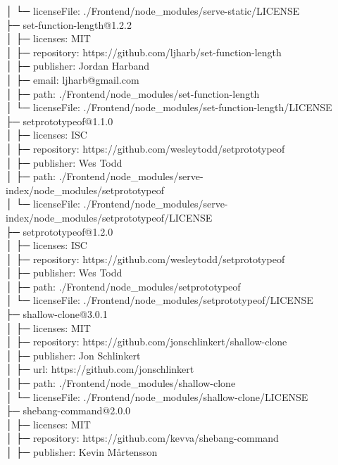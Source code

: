 │  └─ licenseFile: ./Frontend/node\_modules/serve-static/LICENSE\\
├─ set-function-length@1.2.2\\
│  ├─ licenses: MIT\\
│  ├─ repository: https://github.com/ljharb/set-function-length\\
│  ├─ publisher: Jordan Harband\\
│  ├─ email: ljharb@gmail.com\\
│  ├─ path: ./Frontend/node\_modules/set-function-length\\
│  └─ licenseFile: ./Frontend/node\_modules/set-function-length/LICENSE\\
├─ setprototypeof@1.1.0\\
│  ├─ licenses: ISC\\
│  ├─ repository: https://github.com/wesleytodd/setprototypeof\\
│  ├─ publisher: Wes Todd\\
│  ├─ path: ./Frontend/node\_modules/serve-index/node\_modules/setprototypeof\\
│  └─ licenseFile: ./Frontend/node\_modules/serve-index/node\_modules/setprototypeof/LICENSE\\
├─ setprototypeof@1.2.0\\
│  ├─ licenses: ISC\\
│  ├─ repository: https://github.com/wesleytodd/setprototypeof\\
│  ├─ publisher: Wes Todd\\
│  ├─ path: ./Frontend/node\_modules/setprototypeof\\
│  └─ licenseFile: ./Frontend/node\_modules/setprototypeof/LICENSE\\
├─ shallow-clone@3.0.1\\
│  ├─ licenses: MIT\\
│  ├─ repository: https://github.com/jonschlinkert/shallow-clone\\
│  ├─ publisher: Jon Schlinkert\\
│  ├─ url: https://github.com/jonschlinkert\\
│  ├─ path: ./Frontend/node\_modules/shallow-clone\\
│  └─ licenseFile: ./Frontend/node\_modules/shallow-clone/LICENSE\\
├─ shebang-command@2.0.0\\
│  ├─ licenses: MIT\\
│  ├─ repository: https://github.com/kevva/shebang-command\\
│  ├─ publisher: Kevin Mårtensson\\
